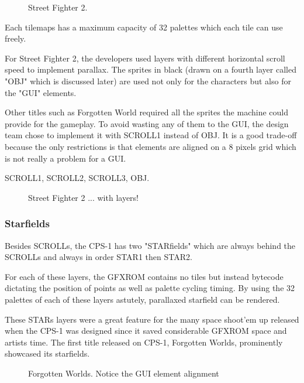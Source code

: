 \vfill
\begin{figure}[!b]
 \caption*{Street Fighter 2.}%
 \end{figure}%
\pagebreak

Each tilemaps has a maximum capacity of 32 palettes which each tile can use freely.

For Street Fighter 2, the developers used layers with different horizontal scroll speed to implement parallax. The sprites in black (drawn on a fourth layer called "OBJ" which is discussed later) are used not only for the characters but also for the "GUI" elements.

Other titles such as Forgotten World required all the sprites the machine could provide for the gameplay. To avoid wasting any of them to the GUI, the design team chose to implement it with SCROLL1 instead of OBJ. It is a good trade-off because the only restrictions is that elements are aligned on a 8 pixels grid which is not really a problem for a GUI.

 SCROLL1,  SCROLL2,  SCROLL3,  OBJ.

\vfill
\begin{figure}[!b]
 \caption*{Street Fighter 2 ... with layers!}%
 \end{figure}%
\pagebreak


\subsubsection{Starfields}
Besides SCROLLs, the CPS-1 has two "STARfields" which are always behind the SCROLLs and always in order STAR1 then STAR2. 

For each of these layers, the GFXROM contains no tiles but instead bytecode dictating the position of points as well as palette cycling timing. By using the 32 palettes of each of these layers astutely, parallaxed starfield can be rendered. 

These STARs layers were a great feature for the many space shoot'em up released when the CPS-1 was designed since it saved considerable GFXROM space and artists time. The first title released on CPS-1, Forgotten Worlds, prominently showcased its starfields.

\vfill
\begin{figure}[!b]
 \caption*{Forgotten Worlds. Notice the GUI element alignment}%
 \end{figure}%
\pagebreak

